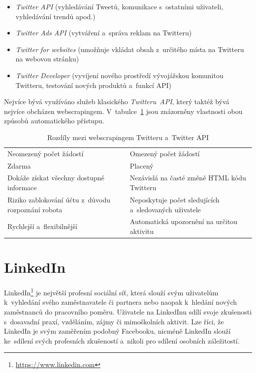 \begin{itemize}
    \item \textit{Twitter API} (vyhledávání Tweetů, komunikace s~ostatními uživateli, vyhledávání trendů apod.)
    \item \textit{Twitter Ads API} (vytváření a~správa reklam na Twitteru)
    \item \textit{Twitter for websites} (umožňuje vkládat obsah z~určitého místa na Twitteru na webovou stránku)
    \item \textit{Twitter Developer} (vyvíjení nového prostředí vývojářskou komunitou Twitteru, testování nových produktů a~funkcí API)
\end{itemize}

\noindent
Nejvíce bývá využíváno služeb klasického \textit{Twitteru~API}, který taktéž bývá nejvíce obcházen webscrapingem. V~tabulce~\ref{tab:Twitter_API_vs_webscraping} jsou znázorněny vlastnosti obou způsobů automatického přístupu.

\begin{table}[H]
\begin{tabularx}{\linewidth}{
    |>{\hsize=1\hsize}X|>{\hsize=1\hsize}X|
  }
\hline

\multicolumn{1}{|c|}{\textbf{Webscraping}} & \multicolumn{1}{|c|}{\textbf{Twitter API}} \\
\hline
Neomezený počet žádostí & Omezený počet žádostí \\
\hline
Zdarma & Placený \\
\hline
Dokáže získat všechny dostupné informace & Nezávislá na časté změně HTML kódu Twitteru \\
\hline
Riziko zablokování účtu z~důvodu rozpoznání robota & Neposkytuje počet sledujících a~sledovaných uživatele~\cite{bib:Twitter_followings}\\ \hline
Rychlejší a~flexibilnější~\cite{bib:Twitter_followings} & Automatická upozornění na určitou aktivitu \\
\hline
\end{tabularx}

\label{tab:Twitter_API_vs_webscraping}
\caption{Rozdíly mezi webscrapingem Twitteru a~Twitter API}
\end{table}

\section{LinkedIn}
LinkedIn\footnote{\href{https://www.linkedin.com}{https://www.linkedin.com}} je největší profesní sociální síť, která slouží svým uživatelům k~vyhledání svého zaměstnavatele či partnera nebo naopak k~hledání nových zaměstnanců do pracovního poměru. Uživatele na LinkedInu sdílí svoje zkušenosti s~dosavadní praxí, vzděláním, zájmy či mimoškolních aktivit. Lze říci, že LinkedIn je svým zaměřením podobný Facebooku, nicméně LinkedIn slouží ke~sdílení svých profesních zkušeností a~nikoli pro sdílení osobních záležitostí. 

